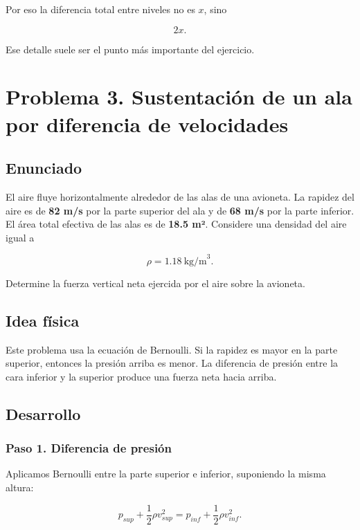 \documentclass[
  letterpaper,
  DIV=11,
  numbers=noendperiod]{scrreprt}
\begin{document}
Por eso la diferencia total entre niveles no es \(x\), sino

\[
2x.
\]

Ese detalle suele ser el punto más importante del ejercicio.

\chapter{Problema 3. Sustentación de un ala por diferencia de
velocidades}\label{problema-3.-sustentaciuxf3n-de-un-ala-por-diferencia-de-velocidades}

\section{Enunciado}\label{enunciado-2}

El aire fluye horizontalmente alrededor de las alas de una avioneta. La
rapidez del aire es de \textbf{82 m/s} por la parte superior del ala y
de \textbf{68 m/s} por la parte inferior. El área total efectiva de las
alas es de \textbf{18.5 m²}. Considere una densidad del aire igual a

\[
\rho = 1.18\ \text{kg/m}^3.
\]

Determine la fuerza vertical neta ejercida por el aire sobre la
avioneta.

\section{Idea física}\label{idea-fuxedsica-2}

Este problema usa la ecuación de Bernoulli. Si la rapidez es mayor en la
parte superior, entonces la presión arriba es menor. La diferencia de
presión entre la cara inferior y la superior produce una fuerza neta
hacia arriba.

\section{Desarrollo}\label{desarrollo}

\subsection{Paso 1. Diferencia de
presión}\label{paso-1.-diferencia-de-presiuxf3n}

Aplicamos Bernoulli entre la parte superior e inferior, suponiendo la
misma altura:

\[
p_{sup}+\frac12\rho v_{sup}^2 = p_{inf}+\frac12\rho v_{inf}^2.
\]
\end{document}
